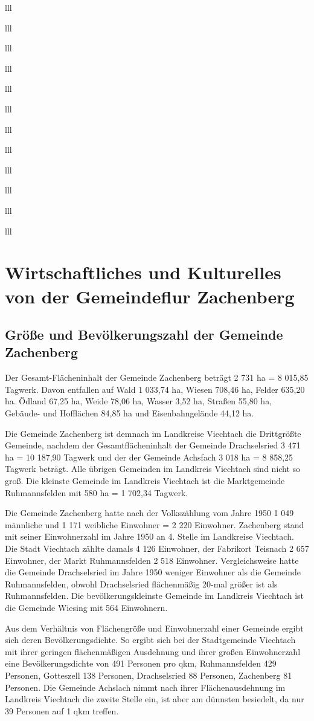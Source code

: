\documentclass[12pt,a4pager]{book}
\begin{document}
\begin{tabuluar}{lll}
\begin{tabuluar}{lll}
\begin{tabuluar}{lll}
\begin{tabuluar}{lll}
\begin{tabuluar}{lll}
\begin{tabuluar}{lll}
\begin{tabuluar}{lll}
\begin{tabuluar}{lll}
\begin{tabuluar}{lll}
\begin{tabuluar}{lll}
\begin{tabuluar}{lll}
\begin{tabuluar}{lll}
\chapter[Wirtschaftliches und Kulturelles]{Wirtschaftliches und Kulturelles von
der Gemeindeflur Zachenberg}

\section{Größe und Bevölkerungszahl der Gemeinde Zachenberg}

Der Gesamt-Flächeninhalt der Gemeinde Zachenberg beträgt 2 731 ha = 8 015,85
Tagwerk. Davon entfallen auf Wald 1 033,74 ha, Wiesen 708,46 ha, Felder 635,20
ha. Ödland 67,25 ha, Weide 78,06 ha, Wasser 3,52 ha, Straßen 55,80 ha, Gebäude-
und Hofflächen 84,85 ha und Eisenbahngelände 44,12 ha.

Die Gemeinde Zachenberg ist demnach im Landkreise Viechtach die Drittgrößte
Gemeinde, nachdem der Gesamtflächeninhalt der Gemeinde Drachselsried 3 471 ha =
10 187,90 Tagwerk und der der Gemeinde Achsfach 3 018 ha = 8 858,25 Tagwerk
beträgt. Alle übrigen Gemeinden im Landkreis Viechtach sind nicht so groß. Die
kleinste Gemeinde im Landkreis Viechtach ist die Marktgemeinde Ruhmannsfelden
mit 580 ha = 1 702,34 Tagwerk.

Die Gemeinde Zachenberg hatte nach der Volkszählung vom Jahre 1950 1 049
männliche und 1 171 weibliche Einwohner = 2 220 Einwohner. Zachenberg stand mit
seiner Einwohnerzahl im Jahre 1950 an 4. Stelle im Landkreise Viechtach. Die
Stadt Viechtach zählte damals 4 126 Einwohner, der Fabrikort Teisnach 2 657
Einwohner, der Markt Ruhmannsfelden 2 518 Einwohner. Vergleichsweise hatte die
Gemeinde Drachselsried im Jahre 1950 weniger Einwohner als die Gemeinde
Ruhmannsfelden, obwohl Drachselsried flächenmäßig 20-mal größer ist als
Ruhmannsfelden. Die bevölkerungskleinste Gemeinde im Landkreis Viechtach ist die
Gemeinde Wiesing mit 564 Einwohnern.

Aus dem Verhältnis von Flächengröße und Einwohnerzahl einer Gemeinde ergibt sich
deren Bevölkerungsdichte. So ergibt sich bei der Stadtgemeinde Viechtach mit
ihrer geringen flächenmäßigen Ausdehnung und ihrer großen Einwohnerzahl eine
Bevölkerungsdichte von 491 Personen pro qkm, Ruhmannsfelden 429 Personen,
Gotteszell 138 Personen, Drachselsried 88 Personen, Zachenberg 81 Personen. Die
Gemeinde Achslach nimmt nach ihrer Flächenausdehnung im Landkreis Viechtach die
zweite Stelle ein, ist aber am dünnsten besiedelt, da nur 39 Personen auf 1 qkm
treffen.


\end{tabuluar}
\end{tabuluar}
\end{tabuluar}
\end{tabuluar}
\end{tabuluar}
\end{tabuluar}
\end{tabuluar}
\end{tabuluar}
\end{tabuluar}
\end{tabuluar}
\end{tabuluar}
\end{tabuluar}
\end{document}
